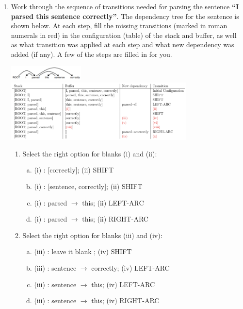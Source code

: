 \begin{enumerate}[1.]
\item Work through the sequence of transitions needed for parsing the sentence {\bf ``I parsed this sentence correctly''}. The dependency tree for the sentence is shown below. At each step, fill the missing transitions (marked in roman numerals in red) in the configuration (table) of the stack and buffer, as well as what transition was applied at each step and what new dependency was added (if any). A few of the steps are filled in for you.

\begin{center}
\includegraphics[width=0.3\textwidth]{4-1.png}
\includegraphics[width=0.75\textwidth]{4-2.png}
\end{center}

\begin{enumerate}[4a.]

\item {} Select the right option for blanks (i) and (ii):

\begin{enumerate}[(a)]
\item (i) : [correctly]; (ii) SHIFT
\item (i) : [sentence, correctly]; (ii) SHIFT
\item (i) : parsed $\rightarrow$ this; (ii) LEFT-ARC
\item (i) : parsed $\rightarrow$ this; (ii) RIGHT-ARC
\end{enumerate}


\item {} Select the right option for blanks (iii) and (iv):

\begin{enumerate}[(a)]
\item (iii) : leave it blank ; (iv) SHIFT
\item (iii) : sentence $\rightarrow$ correctly; (iv) LEFT-ARC
\item (iii) : sentence $\rightarrow$ this; (iv) LEFT-ARC
\item (iii) : sentence $\rightarrow$ this; (iv) RIGHT-ARC
\end{enumerate}


\end{enumerate}
\end{enumerate}
